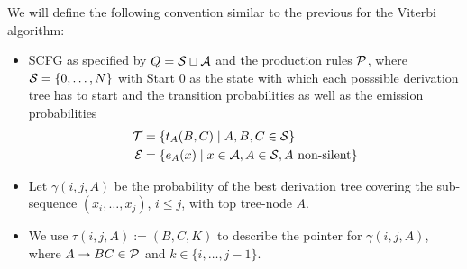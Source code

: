 We will define the following convention similar to the previous for the Viterbi
algorithm:
\begin{itemize}
\item SCFG as specified by \(Q=\mathcal{S}\sqcup\mathcal{A}\) and the
  production rules \(\mathcal{P}\), where \(\mathcal{S}=\{0,\dotsc,N\}\) with Start \(0\)
  as the state with which each posssible derivation tree has to start and the
  transition probabilities as well as the emission probabilities
  \begin{align*}
    \mathcal{T} &=\{t_A(B,C) \mid A,B,C\in\mathcal{S}\} \\
    \mathcal{E}&=\{e_A(x) \mid x\in\mathcal{A}, A\in\mathcal{S}, A\text{ non-silent} \}
  \end{align*}
\item Let \(\gamma(i,j,A)\) be the probability of the
  best derivation tree covering the sub-sequence \((x_i,\dotsc,x_j)\),
  \(i\leq j\), with top tree-node \(A\).
\item We use \(\tau(i,j,A):=(B,C,K)\) to describe the pointer for
  \(\gamma(i,j,A)\), where \(A\to BC\in\mathcal{P}\) and \(k\in\{i,\dotsc,j-1\}\).
\end{itemize}

